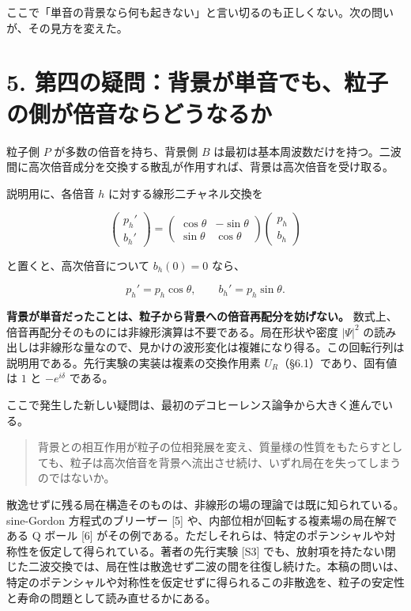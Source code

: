\documentclass[
  a4paper,
]{ltjsarticle}
\begin{document}
ここで「単音の背景なら何も起きない」と言い切るのも正しくない。次の問いが、その見方を変えた。

\section{5.
第四の疑問：背景が単音でも、粒子の側が倍音ならどうなるか}\label{ux7b2cux56dbux306eux7591ux554fux80ccux666fux304cux5358ux97f3ux3067ux3082ux7c92ux5b50ux306eux5074ux304cux500dux97f3ux306aux3089ux3069ux3046ux306aux308bux304b}

粒子側 \(P\) が多数の倍音を持ち、背景側 \(B\)
は最初は基本周波数だけを持つ。二波間に高次倍音成分を交換する散乱が作用すれば、背景は高次倍音を受け取る。

説明用に、各倍音 \(h\) に対する線形二チャネル交換を

\[
\begin{pmatrix}p_h'\\b_h'\end{pmatrix}
=
\begin{pmatrix}
\cos\theta&-\sin\theta\\
\sin\theta&\cos\theta
\end{pmatrix}
\begin{pmatrix}p_h\\b_h\end{pmatrix}
\]

と置くと、高次倍音について \(b_h(0)=0\) なら、

\[
p_h' =p_h\cos\theta,\qquad
b_h'=p_h\sin\theta.
\]

\textbf{背景が単音だったことは、粒子から背景への倍音再配分を妨げない。}
数式上、倍音再配分そのものには非線形演算は不要である。局在形状や密度
\(|\Psi|^2\)
の読み出しは非線形な量なので、見かけの波形変化は複雑になり得る。この回転行列は説明用である。先行実験の実装は複素の交換作用素
\(U_R\)（§6.1）であり、固有値は \(1\) と \(-e^{i\delta}\) である。

ここで発生した新しい疑問は、最初のデコヒーレンス論争から大きく進んでいる。

\begin{quote}
背景との相互作用が粒子の位相発展を変え、質量様の性質をもたらすとしても、粒子は高次倍音を背景へ流出させ続け、いずれ局在を失ってしまうのではないか。
\end{quote}

散逸せずに残る局在構造そのものは、非線形の場の理論では既に知られている。sine-Gordon
方程式のブリーザー {[}5{]} や、内部位相が回転する複素場の局在解である Q
ボール {[}6{]}
がその例である。ただしそれらは、特定のポテンシャルや対称性を仮定して得られている。著者の先行実験
{[}S3{]}
でも、放射項を持たない閉じた二波交換では、局在性は散逸せず二波の間を往復し続けた。本稿の問いは、特定のポテンシャルや対称性を仮定せずに得られるこの非散逸を、粒子の安定性と寿命の問題として読み直せるかにある。
\end{document}

